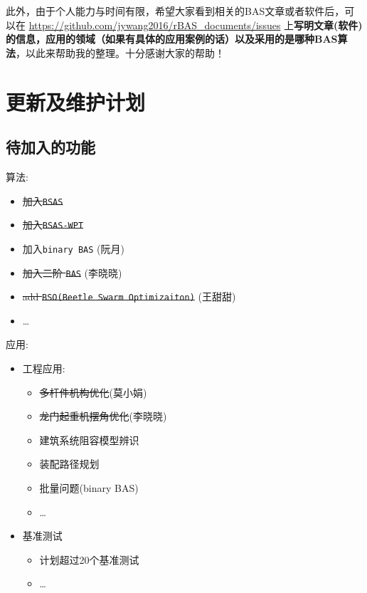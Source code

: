 \documentclass[]{ctexbook}
\providecommand{\tightlist}{%
  \setlength{\itemsep}{0pt}\setlength{\parskip}{0pt}}
\begin{document}
此外，由于个人能力与时间有限，希望大家看到相关的BAS文章或者软件后，可以在
\url{https://github.com/jywang2016/rBAS_documents/issues}
上\textbf{写明文章(软件)的信息，应用的领域（如果有具体的应用案例的话）以及采用的是哪种BAS算法}，以此来帮助我的整理。十分感谢大家的帮助！

\chapter{更新及维护计划}\label{updates}

\section{待加入的功能}

算法:

\begin{itemize}
\tightlist
\item
  \sout{加入\texttt{BSAS}}
\item
  \sout{加入\texttt{BSAS-WPT}}
\item
  加入\texttt{binary\ BAS} (阮月)
\item
  \sout{加入二阶 \texttt{BAS}} (李晓晓)
\item
  \sout{add \texttt{BSO(Beetle\ Swarm\ Optimizaiton)}} (王甜甜)
\item
  \ldots{}
\end{itemize}

应用:

\begin{itemize}
\tightlist
\item
  工程应用:

  \begin{itemize}
  \tightlist
  \item
    \sout{多杆件机构优化}(莫小娟)
  \item
    \sout{龙门起重机摆角优化}(李晓晓)
  \item
    建筑系统阻容模型辨识
  \item
    装配路径规划
  \item
    批量问题(binary BAS)
  \item
    \ldots{}
  \end{itemize}
\item
  基准测试

  \begin{itemize}
  \tightlist
  \item
    计划超过20个基准测试
  \item
    \ldots{}
  \end{itemize}
\end{itemize}
\end{document}

